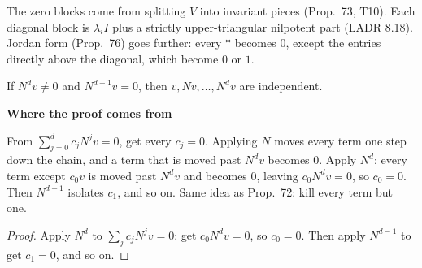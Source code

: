 \documentclass[10pt]{scrartcl}
\newenvironment{fig}{\par\needspace{9\baselineskip}\medskip\begin{center}}{\end{center}\medskip}
\newcommand{\figcap}[1]{\par\vspace{3pt}\begin{minipage}{0.86\linewidth}\small\centering #1\end{minipage}}
\newcommand{\MM}{\mathcal M}
\newenvironment{motive}{\begin{mdframed}[style=thinkbox]\textbf{\color{OliveGreen!75!black}Where the proof comes from}\begin{description}[leftmargin=0.9em,labelindent=0pt,itemsep=2pt,topsep=2pt,font=\normalfont\bfseries\color{OliveGreen!70!black}]}{\end{description}\end{mdframed}}
\begin{document}
\begin{fig}
\figcap{The zero blocks come from splitting $V$ into invariant pieces (Prop.~73, T10). Each diagonal block is $\lambda_iI$ plus a strictly upper-triangular nilpotent part (LADR 8.18). Jordan form (Prop.~76) goes further: every $*$ becomes $0$, except the entries directly above the diagonal, which become $0$ or $1$.}
\end{fig}

\begin{proposition*}
  If $N^dv\ne0$ and $N^{d+1}v=0$, then $v,Nv,\dots,N^dv$ are independent.
\end{proposition*}
\begin{motive}
  \ii[Want.] From $\sum_{j=0}^dc_jN^jv=0$, get every $c_j=0$.
  \ii[Know.] Applying $N$ moves every term one step down the chain, and a term that is moved past $N^dv$ becomes $0$.
   Apply $N^d$: every term except $c_0v$ is moved past $N^dv$ and becomes $0$, leaving $c_0N^dv=0$, so $c_0=0$. Then $N^{d-1}$ isolates $c_1$, and so on. Same idea as Prop.~72: kill every term but one.
\end{motive}
\begin{proof}
  Apply $N^d$ to $\sum_jc_jN^jv=0$: get $c_0N^dv=0$, so $c_0=0$. Then apply $N^{d-1}$ to get $c_1=0$, and so on.
\end{proof}
\end{document}
